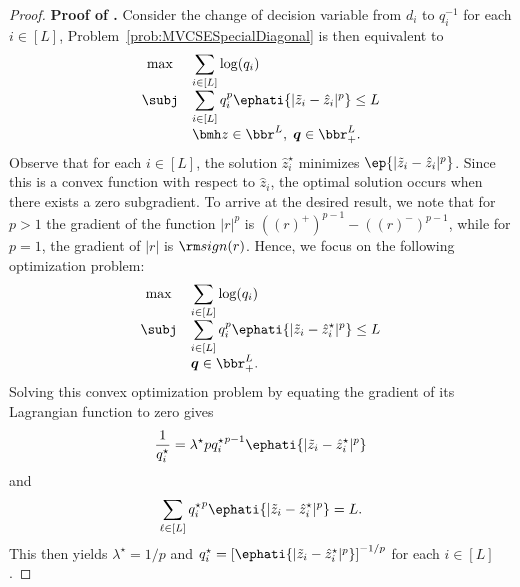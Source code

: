 \documentclass[mnsc, nonblindrev]{informswp}
\newcommand{\1}[1]{\mathds{1}{\left(#1\right)}}
\begin{document}
\begin{appendices}
\begin{proof}{\bf Proof of .}
Consider the change of decision variable from $d_i$ to $q_i^{-1}$ for each $i \in [L]$,  Problem~\eqref{prob:MVCSESpecialDiagonal} is then equivalent to 
\[
\begin{array}{cll}
\max & \displaystyle \sum_{i \in [L]}\log(q_i) \\
\subj & \displaystyle\sum_{i \in [L]}q^p_i \ephati{|\tilde z_i - \hat z_i|^p} \leq L \\
& \bmh z \in \bbr^L, \; \bm  q \in \bbr^L_+.  
\end{array} 
\]
Observe that for each $i \in [L]$, the solution $\hat z_i^\star$ minimizes $\ep{|\tilde z_i - \hat z_i|^p}$. Since this is a convex function with respect to $\hat z_i$, the optimal solution occurs when there exists a zero subgradient. To arrive at the desired result, we note that for $p>1$ the gradient of the function $|r|^p$ is $((r)^+)^{p-1}- ((r)^-)^{p-1}$, while for $p=1$, the gradient of $|r|$ is ${\rm sign}(r)$. Hence, we focus on the following optimization problem:
\[
\begin{array}{cll}
\max & \displaystyle \sum_{i \in [L]}\log(q_i) \\
\subj & \displaystyle\sum_{i \in [L]}q^p_i\ephati{|\tilde z_i - \hat z^\star_i|^p} \leq L \\
&\bm  q \in \bbr^L_+.  
\end{array} 
\]
Solving this convex optimization problem by equating the gradient of its Lagrangian function to zero gives 
$$
\frac{1}{q^\star_i} = \lambda^\star p {q^\star_i}^{p-1} \ephati{|\tilde z_i - \hat z^\star_i|^p}
$$
and
$$
\sum_{\ell \in [L]}{q^\star_i}^p\ephati{|\tilde z_i - \hat z^\star_i|^p} = L.
$$
This then yields $\lambda^\star = 1/p$ and ${q^\star_i} = \left[\ephati{|\tilde z_i - \hat z^\star_i|^p}\right]^{-1/p}$ for each $i \in [L]$.
\hfill \Halmos
\end{proof}
\vspace{3mm}


\end{appendices}
\end{document}
